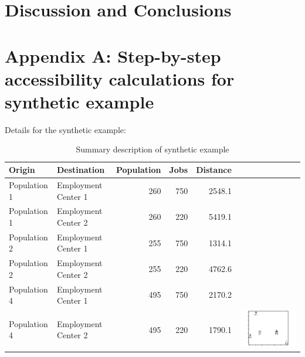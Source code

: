 \documentclass[]{elsarticle} %
\begin{document}
\newpage

\hypertarget{discussion-and-conclusions}{%
\section{Discussion and Conclusions}\label{discussion-and-conclusions}}

\hypertarget{appendix-a-step-by-step-accessibility-calculations-for-synthetic-example}{%
\section{Appendix A: Step-by-step accessibility calculations for
synthetic
example}\label{appendix-a-step-by-step-accessibility-calculations-for-synthetic-example}}

Details for the synthetic example:

\begin{table}

\caption{\label{tab:toy-example-table-appendix}\label{tab:toy-example}Summary description of synthetic example}
\centering
\begin{tabular}[t]{llrrr>{}l}
\toprule
Origin & Destination & Population & Jobs & Distance &  \\
\midrule
Population 1 & Employment Center 1 & 260 & 750 & 2548.1 & \\

Population 1 & Employment Center 2 & 260 & 220 & 5419.1 & \\

Population 2 & Employment Center 1 & 255 & 750 & 1314.1 & \\

Population 2 & Employment Center 2 & 255 & 220 & 4762.6 & \\

Population 4 & Employment Center 1 & 495 & 750 & 2170.2 & \\

Population 4 & Employment Center 2 & 495 & 220 & 1790.1 & \multirow{-6}{*}{\raggedright\arraybackslash \includegraphics{images/figure-1.png}}\\
\bottomrule
\end{tabular}
\end{table}
\end{document}
